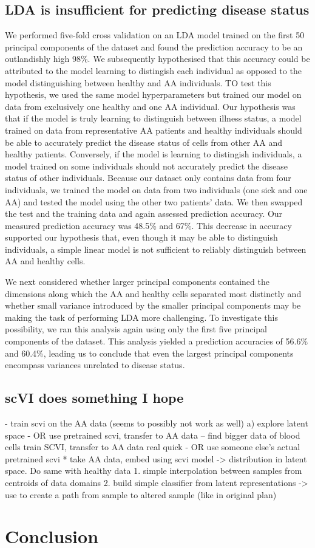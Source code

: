 \documentclass{article}
\begin{document}
\subsection{LDA is insufficient for predicting disease status}
We performed five-fold cross validation on an LDA model trained on the first 50 principal components of the dataset and found the prediction accuracy to be an outlandishly high 98\%.
We subsequently hypothesised that this accuracy could be attributed to the model learning to distingish each individual as opposed to the model distinguishing between healthy and AA individuals.
TO test this hypothesis, we used the same model hyperparameters but trained our model on data from exclusively one healthy and one AA individual.
Our hypothesis was that if the model is truly learning to distinguish between illness status, a model trained on data from representative AA patients and healthy individuals should be able to accurately predict the disease status of cells from other AA and healthy patients.
Conversely, if the model is learning to distingish individuals, a model trained on some individuals should not accurately predict the disease status of other individuals.
Because our dataset only contains data from four individuals, we trained the model on data from two individuals (one sick and one AA) and tested the model using the other two patients' data.
We then swapped the test and the training data and again assessed prediction accuracy.
Our measured prediction accuracy was 48.5\% and 67\%.
This decrease in accuracy supported our hypothesis that, even though it may be able to distinguish individuals, a simple linear model is not sufficient to reliably distinguish between AA and healthy cells.

We next considered whether larger principal components contained the dimensions along which the AA and healthy cells separated most distinctly and whether small variance introduced by the smaller principal components may be making the task of performing LDA more challenging.
To investigate this possibility, we ran this analysis again using only the first five principal components of the dataset.
This analysis yielded a prediction accuracies of 56.6\% and 60.4\%, leading us to conclude that even the largest principal components encompass variances unrelated to disease status.

\subsection*{scVI does something I hope}
- train scvi on the AA data (seems to possibly not work as well)
a) explore latent space
- OR use pretrained scvi, transfer to AA data -- find bigger data of blood cells train SCVI, transfer to AA data real quick
- OR use someone else's actual pretrained scvi
* take AA data, embed using scvi model -> distribution in latent space. Do same with healthy data
1. simple interpolation between samples from centroids of data domains
2. build simple classifier from latent representations -> use to create a path from sample to altered sample (like in original plan) 


\section{Conclusion}



{
\small
\printbibliography
}
\end{document}
